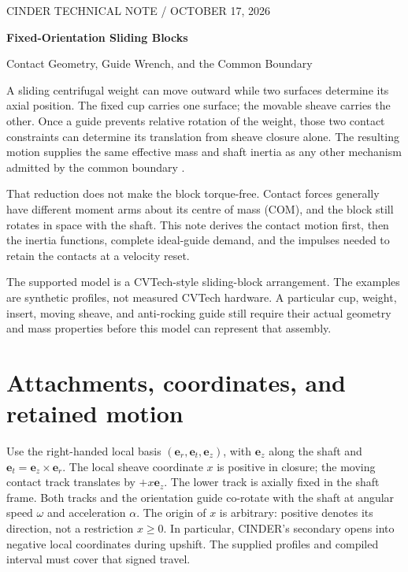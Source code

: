 \documentclass[11pt,letterpaper]{article}
\numberwithin{equation}{section}
\newcommand{\er}{\bm e_r}\newcommand{\et}{\bm e_t}\newcommand{\ez}{\bm e_z}
\begin{document}
\begin{center}
{\small CINDER TECHNICAL NOTE / OCTOBER 17, 2026}\par\vspace{.7em}
{\LARGE\bfseries Fixed-Orientation Sliding Blocks}\par\vspace{.4em}
{\large Contact Geometry, Guide Wrench, and the Common Boundary}
\end{center}

A sliding centrifugal weight can move outward while two surfaces determine its
axial position. The fixed cup carries one surface; the movable sheave carries
the other. Once a guide prevents relative rotation of the weight, those two
contact constraints can determine its translation from sheave closure alone.
The resulting motion supplies the same effective mass and shaft inertia as
any other mechanism admitted by the common boundary \cite{common}.

That reduction does not make the block torque-free. Contact forces generally
have different moment arms about its centre of mass (COM), and the block still
rotates in space with the shaft. This note derives the contact motion first,
then the inertia functions, complete ideal-guide demand, and the impulses
needed to retain the contacts at a velocity reset.

The supported model is a CVTech-style sliding-block arrangement. The examples
are synthetic profiles, not measured CVTech hardware. A particular cup, weight,
insert, moving sheave, and anti-rocking guide still require their actual
geometry and mass properties before this model can represent that assembly.

\hypertarget{contents}{}\setcounter{tocdepth}{1}\tableofcontents
\clearpage
\section{Attachments, coordinates, and retained motion}

Use the right-handed local basis $(\er,\et,\ez)$, with $\ez$ along the shaft
and $\et=\ez\times\er$. The local sheave coordinate $x$ is positive in closure;
the moving contact track translates by $+x\ez$. The lower track is axially
fixed in the shaft frame. Both tracks and the orientation guide co-rotate
with the shaft at angular speed $\omega$ and acceleration $\alpha$.
The origin of $x$ is arbitrary: positive denotes its direction, not a
restriction $x\geq0$. In particular, CINDER's secondary opens into negative
local coordinates during upshift. The supplied profiles and compiled interval
must cover that signed travel.
\end{document}
